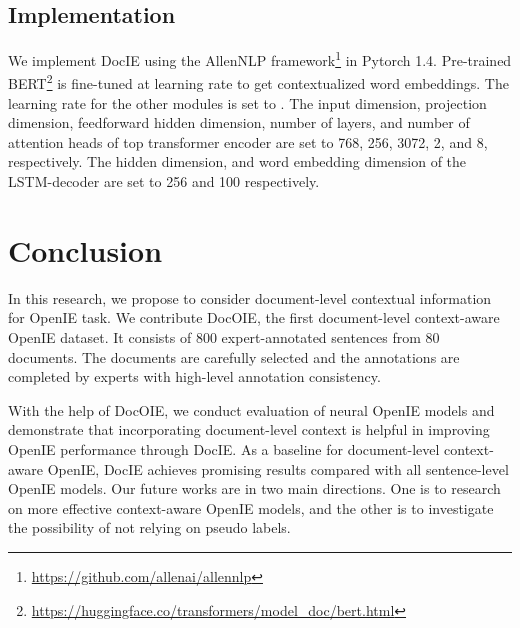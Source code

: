 \documentclass[11pt,a4paper]{article}
\newcommand{\dname}{DocOIE\xspace}
\newcommand{\mname}{DocIE\xspace}
\begin{document}
\subsection{Implementation}
We implement \mname using the AllenNLP framework\footnote{\url{https://github.com/allenai/allennlp}} in Pytorch 1.4. Pre-trained BERT\footnote{\url{https://huggingface.co/transformers/model_doc/bert.html}} is fine-tuned at learning rate  to get contextualized word embeddings. The learning rate for the other modules is set to . The input dimension, projection dimension, feedforward hidden dimension, number of layers, and number of attention heads of top transformer encoder are set to 768, 256, 3072, 2, and 8, respectively. The hidden dimension, and word embedding dimension of the LSTM-decoder are set to 256 and 100 respectively.


\section{Conclusion}


In this research, we propose to consider document-level contextual information for OpenIE task. We contribute \dname, the first document-level context-aware OpenIE dataset. It consists of 800 expert-annotated sentences from 80 documents. The documents are carefully selected and the annotations are completed by experts with high-level annotation consistency. 

With the help of \dname, we conduct evaluation of neural OpenIE models and demonstrate that incorporating document-level context is helpful in improving OpenIE performance through \mname.  As a baseline for document-level context-aware OpenIE, \mname achieves promising results compared with all sentence-level OpenIE models. Our future works are in two main directions. One is to research on more effective context-aware OpenIE models, and the other is to investigate the possibility of not relying on pseudo labels.




\end{document}
